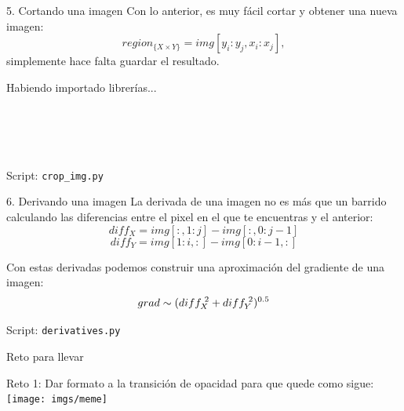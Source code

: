 \documentclass[usenames,dvipsnames]{beamer}
\begin{document}
  \begin{frame}{5. Cortando una imagen}
    Con lo anterior, es muy fácil cortar y obtener una nueva imagen:
    $$region_{\{X\times Y\}} = img[y_i:y_j, x_i:x_j],$$
    simplemente hace falta guardar el resultado.\\
    \vspace*{0.3cm}
    \begin{block}{Habiendo importado librerías...}
      \\
      \\
      \\
      \\
      \\
      \vspace*{0.5cm}
    \end{block}
    Script: \texttt{crop\_img.py}
  \end{frame}

  \begin{frame}{6. Derivando una imagen}
    La derivada de una imagen no es más que un barrido calculando las
    diferencias entre el pixel en el que te encuentras y el anterior:
    $$diff_X = img[:,1:j] - img[:,0:j-1]$$
    $$diff_Y = img[1:i,:] - img[0:i-1,:]$$

    Con estas derivadas podemos construir una aproximación del
    gradiente de una imagen:
    $$grad \sim (diff_X^{\hspace*{0.1cm}2} + diff_Y^{\hspace*{0.1cm}2})^{0.5}$$

    Script: \texttt{derivatives.py}
  \end{frame}

  \begin{frame}{Reto para llevar}
    \vspace*{0.5cm}
    \begin{block}{Reto 1:}
      Dar formato a la transición de opacidad para que quede como sigue:\\
      \centering
      \texttt{[image: imgs/meme]}
      \vspace*{0.5cm}
    \end{block}
  \end{frame}
\end{document}
